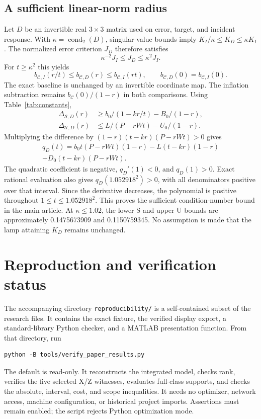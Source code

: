 \documentclass[9pt]{osa-supplemental-document}
\begin{document}
\subsection{A sufficient linear-norm radius}
Let $D$ be an invertible real $3\times3$ matrix used on error, target, and incident response. With $\kappa=\operatorname{cond}_2(D)$, singular-value bounds imply $K_I/\kappa\leq K_D\leq\kappa K_I$. The normalized error criterion $J_D$ therefore satisfies
\begin{equation}
 \kappa^{-2}J_I\leq J_D\leq\kappa^2J_I.
\end{equation}
For $t\geq\kappa^2$ this yields
\begin{equation}
 b_{\mathcal C,I}(r/t)\leq b_{\mathcal C,D}(r)\leq b_{\mathcal C,I}(rt),
 \qquad b_{\mathcal C,D}(0)=b_{\mathcal C,I}(0).
\end{equation}
The exact baseline is unchanged by an invertible coordinate map. The inflation subtraction remains $b_{\mathcal C}(0)/(1-r)$ in both comparisons. Using Table~\ref{tab:constants},
\begin{align}
 \Delta_{\mathcal S,D}(r)&\geq b_0/(1-kr/t)-B_0/(1-r),\\
 \Delta_{\mathcal U,D}(r)&\leq L/(P-rWt)-U_0/(1-r).
\end{align}
Multiplying the difference by $(1-r)(t-kr)(P-rWt)>0$ gives
\begin{multline}
 q_D(t)=b_0t(P-rWt)(1-r)-L(t-kr)(1-r)\\
 +D_0(t-kr)(P-rWt).
\end{multline}
The quadratic coefficient is negative, $q_D'(1)<0$, and $q_D(1)>0$. Exact rational evaluation also gives $q_D(1.052918^2)>0$, with all denominators positive over that interval. Since the derivative decreases, the polynomial is positive throughout $1\leq t\leq1.052918^2$. This proves the sufficient condition-number bound in the main article. At $\kappa\leq1.02$, the lower S and upper U bounds are approximately 0.1475673909 and 0.1150759345. No assumption is made that the lamp attaining $K_D$ remains unchanged.

\section{Reproduction and verification status}
The accompanying directory \texttt{reproducibility/} is a self-contained subset of the research files. It contains the exact fixture, the verified display export, a standard-library Python checker, and a MATLAB presentation function. From that directory, run
\begin{verbatim}
python -B tools/verify_paper_results.py
\end{verbatim}
The default is read-only. It reconstructs the integrated model, checks rank, verifies the five selected X/Z witnesses, evaluates full-class supports, and checks the absolute, interval, cost, and scope inequalities. It needs no optimizer, network access, machine configuration, or historical project imports. Assertions must remain enabled; the script rejects Python optimization mode.
\end{document}
